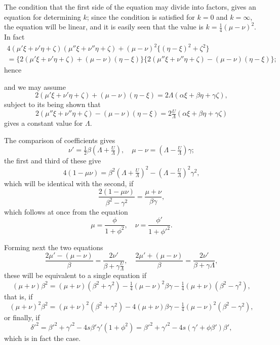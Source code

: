 \documentclass[11pt,a4paper]{book}
\begin{document}
The condition that the first side of the equation may divide into factors, gives an equation for determining $k$; since the condition is satisfied for $k=0$ and $k=\infty$, the equation will be linear, and it is easily seen that the value is $k=\tfrac{1}{4}(\mu-\nu)^2$. In fact
\begin{multline*}
4(\mu'\xi+\nu'\eta+\zeta)(\mu''\xi+\nu''\eta+\zeta) + (\mu-\nu)^2\{(\eta-\xi)^2+\zeta^2\}\\
= \{2(\mu'\xi+\nu'\eta+\zeta)+(\mu-\nu)(\eta-\xi)\}\{2(\mu''\xi+\nu''\eta+\zeta)-(\mu-\nu)(\eta-\xi)\};
\end{multline*}
hence

\newpage
\setcounter{page}{71}

and we may assume
\[
2(\mu'\xi+\nu'\eta+\zeta)+(\mu-\nu)(\eta-\xi) = 2\Lambda(\alpha\xi+\beta\eta+\gamma\zeta),
\]
subject to its being shown that
\[
2(\mu''\xi+\nu''\eta+\zeta)-(\mu-\nu)(\eta-\xi) = 2\tfrac{U}{\Lambda}(\alpha\xi+\beta\eta+\gamma\zeta)
\]
gives a constant value for $\Lambda$.

The comparison of coefficients gives
\[
\nu' = \tfrac{1}{2}\beta(\Lambda+\tfrac{U}{\Lambda}), \quad \mu-\nu = (\Lambda-\tfrac{U}{\Lambda})\gamma;
\]
the first and third of these give
\[
4(1-\mu\nu) = \beta^2(\Lambda+\tfrac{U}{\Lambda})^2 - (\Lambda-\tfrac{U}{\Lambda})^2\gamma^2,
\]
which will be identical with the second, if
\[
\frac{2(1-\mu\nu)}{\beta^2-\gamma^2} = \frac{\mu+\nu}{\beta\gamma},
\]
which follows at once from the equation
\[
\mu = \frac{\phi}{1+\phi^2}, \quad \nu = \frac{\phi'}{1+\phi'^2}.
\]

Forming next the two equations
\[
\frac{2\mu'- (\mu-\nu)}{\beta} = \frac{2\nu'}{\beta+\gamma\tfrac{U}{\Lambda}}, \quad \frac{2\mu'+ (\mu-\nu)}{\beta} = \frac{2\nu'}{\beta+\gamma\Lambda},
\]
these will be equivalent to a single equation if
\[
(\mu+\nu)\beta^2 = (\mu+\nu)(\beta^2+\gamma^2) - \tfrac{1}{4}(\mu-\nu)^2\beta\gamma - \tfrac{1}{4}(\mu+\nu)(\beta^2-\gamma^2),
\]
that is, if
\[
(\mu+\nu)^2\beta^2 = (\mu+\nu)^2(\beta^2+\gamma^2) - 4(\mu+\nu)\beta\gamma - \tfrac{1}{4}(\mu-\nu)^2(\beta^2-\gamma^2),
\]
or finally, if
\[
\delta'^2 = \beta'^2+\gamma'^2-4s\beta'\gamma'(1+\phi^2) = \beta'^2+\gamma'^2-4s(\gamma'+\phi\beta')\beta',
\]
which is in fact the case.

\newpage
\setcounter{page}{72}
\end{document}
